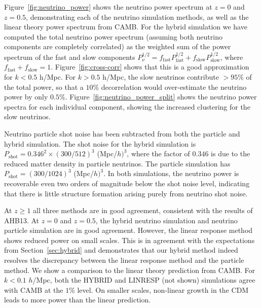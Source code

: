 \documentclass[useAMS, usenatbib]{mnras}
\begin{document}
Figure~\ref{fig:neutrino_power} shows the neutrino power spectrum at $z=0$ and $z=0.5$, demonstrating each of the neutrino simulation methods, as well as the linear theory power spectrum from CAMB. For the hybrid simulation we have computed the total neutrino power spectrum (assuming both neutrino components are completely correlated) as the weighted sum of the power spectrum of the fast and slow components $P^{1/2}_\nu = f_\mathrm{fast} P^{1/2}_\mathrm{fast} + f_\mathrm{slow} P^{1/2}_\mathrm{slow}$, where $f_\mathrm{fast} + f_\mathrm{slow} = 1$. Figure~\ref{fig:cross-corr} shows that this is a good approximation for $k < 0.5$ h/Mpc. For $k > 0.5$ h/Mpc, the slow neutrinos contribute $> 95\%$ of the total power, so that a $10\%$ decorrelation would over-estimate the neutrino power by only $0.5\%$. Figure~\ref{fig:neutrino_power_split} shows the neutrino power spectra for each individual component, showing the increased clustering for the slow neutrinos.

Neutrino particle shot noise has been subtracted from both the particle and hybrid simulation. The shot noise for the hybrid simulation is $P_\mathrm{shot} = 0.346^2\times (300 /512)^3 $ (Mpc/$h)^3$, where the factor of $0.346$ is due to the reduced matter density in particle neutrinos. The particle simulation has $P_\mathrm{shot} = (300 /1024)^3$ (Mpc/$h)^3$. In both simulations, the neutrino power is recoverable even two orders of magnitude below the shot noise level, indicating that there is little structure formation arising purely from neutrino shot noise.


At $z \geq 1$ all three methods are in good agreement, consistent with the results of AHB13. At $z = 0$ and $z=0.5$, the hybrid neutrino simulation and neutrino particle simulation are in good agreement. However, the linear response method shows reduced power on small scales. This is in agreement with the expectations from Section~\ref{sec:hybrid} and demonstrates that our hybrid method indeed resolves the discrepancy between the linear response method and the particle method. We show a comparison to the linear theory prediction from CAMB. For $k < 0.1$ $h$/Mpc, both the HYBRID and LINRESP (not shown) simulations agree with CAMB at the $1\%$ level. On smaller scales, non-linear growth in the CDM leads to more power than the linear prediction.
\end{document}
